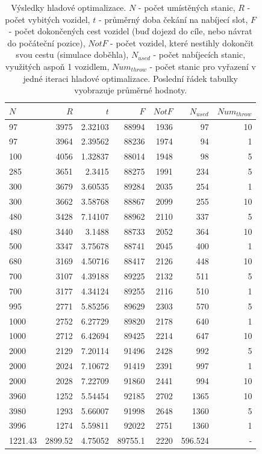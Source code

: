 \begin{table}
\centering\footnotesize\sf
\begin{tabular}{lrrrrrr}
\toprule
$N$ & $R$ & $t$ & $F$ & $Not F$ & $N_{used}$ & $Num_{throw}$ \\
\midrule
97 & 3975 & 2.32103 & 88994 & 1936 & 97 & 10 \\
97 & 3964 & 2.39562 & 88236 & 1974 & 94 & 1 \\
100 & 4056 & 1.32837 & 88014 & 1948 & 98 & 5 \\
285 & 3651 & 2.3415 & 88275 & 1991 & 234 & 5 \\
300 & 3679 & 3.60535 & 89284 & 2035 & 254 & 1 \\
300 & 3662 & 3.58768 & 88867 & 2099 & 255 & 10 \\
480 & 3428 & 7.14107 & 88962 & 2110 & 337 & 5 \\
480 & 3440 & 3.1488 & 88733 & 2052 & 364 & 10 \\
500 & 3347 & 3.75678 & 88741 & 2045 & 400 & 1 \\
680 & 3169 & 4.50716 & 88417 & 2126 & 448 & 10 \\
700 & 3107 & 4.39188 & 89225 & 2132 & 511 & 5 \\
700 & 3177 & 4.34124 & 89255 & 2116 & 510 & 1 \\
995 & 2771 & 5.85256 & 89629 & 2303 & 570 & 5 \\
1000 & 2752 & 6.27729 & 89820 & 2178 & 640 & 1 \\
1000 & 2712 & 6.42694 & 89425 & 2214 & 647 & 10 \\
2000 & 2129 & 7.20114 & 91496 & 2428 & 992 & 5 \\
2000 & 2024 & 7.10672 & 91419 & 2391 & 997 & 1 \\
2000 & 2028 & 7.22709 & 91860 & 2441 & 994 & 10 \\
3960 & 1252 & 5.54454 & 92185 & 2702 & 1365 & 10 \\
3980 & 1293 & 5.66007 & 91998 & 2648 & 1360 & 5 \\
3996 & 1274 & 5.59811 & 92022 & 2751 & 1360 & 1 \\
\bottomrule
1221.43 & 2899.52 & 4.75052 & 89755.1 & 2220 & 596.524 & - \\
\end{tabular}
\caption{Výsledky hladové optimalizace.
$N$ - počet umístěných stanic, $R$ - počet vybitých vozidel, $t$ - průměrný doba čekání na nabíjecí slot, $F$ - počet dokončených
cest vozidel (buď dojezd do cíle, nebo návrat do počáteční pozice), $Not F$ - počet vozidel, které nestihly
dokončit svou cestu (simulace doběhla), $N_{used}$ - počet nabíjecích stanic, využitých aspoň 1 vozidlem, 
$Num_{throw}$ - počet stanic pro vyřazení v jedné iteraci hladové optimalizace. Poslední
řádek tabulky vyobrazuje průměrné hodnoty.}
\label{tab:vysledky_greedy}
\end{table}


